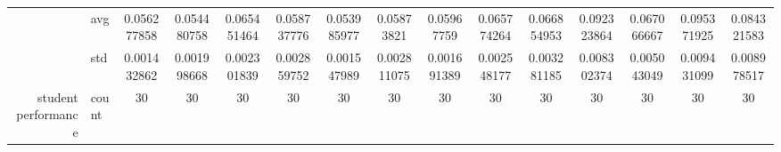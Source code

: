 \begin{table}[htbp]
{\begin{tabular}{rlccc|c|c|c|c|c|ccccc}
			                                                                               & avg                & \cellcolor[rgb]{ .51,  .776,  .486}0.056277858                                 & \cellcolor[rgb]{ .412,  .749,  .482}0.054480758                                & \cellcolor[rgb]{ 1,  .922,  .518}0.065451464                                   & \cellcolor[rgb]{ .639,  .816,  .494}0.058737776 & \cellcolor[rgb]{ .388,  .745,  .482}\textcolor[rgb]{ 0,  .38,  0}{0.053985977} & \cellcolor[rgb]{ .639,  .816,  .494}0.05873821  & \cellcolor[rgb]{ .69,  .831,  .498}0.05967759                                  & \cellcolor[rgb]{ 1,  .918,  .518}0.065774264    & \cellcolor[rgb]{ 1,  .898,  .514}0.066854953    & \cellcolor[rgb]{ .976,  .467,  .431}0.092323864 & \cellcolor[rgb]{ 1,  .894,  .514}0.067066667    & \cellcolor[rgb]{ .973,  .412,  .42}0.095371925  & \cellcolor[rgb]{ .984,  .604,  .459}0.084321583 \\
			                                                                               & std                & 0.001432862                                                                    & 0.001998668                                                                    & 0.002301839                                                                    & 0.002859752                                     & 0.001547989                                                                    & 0.002811075                                     & 0.001691389                                                                    & 0.002548177                                     & 0.003281185                                     & 0.008302374                                     & 0.005043049                                     & 0.009431099                                     & 0.008978517                                     \\
			student performance                                                            & count              & 30                                                                             & 30                                                                             & 30                                                                             & 30                                              & 30                                                                             & 30                                              & 30                                                                             & 30                                              & 30                                              & 30                                              & 30                                              & 30                                              & 30                                              \\

\end{tabular}}
\end{table}
